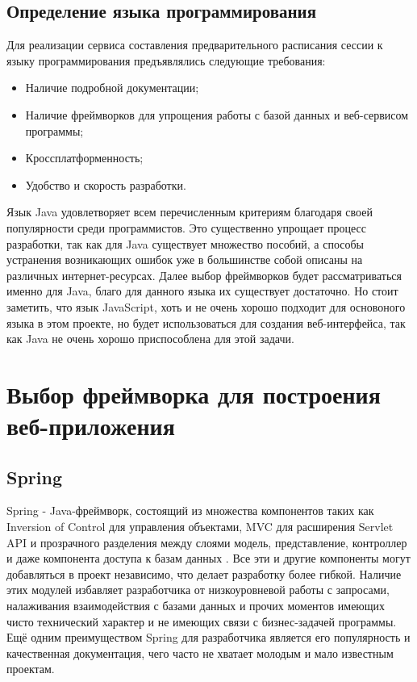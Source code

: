 \subsection{Определение языка программирования}
Для реализации сервиса составления предварительного расписания сессии к языку программирования предъявлялись следующие требования:
\begin{itemize}
\item Наличие подробной документации;
\item Наличие фреймворков для упрощения работы с базой данных и веб-сервисом программы;
\item Кроссплатформенность;
\item Удобство и скорость разработки.
\end{itemize}

Язык Java удовлетворяет всем перечисленным критериям благодаря своей популярности среди программистов. Это существенно упрощает процесс разработки, так как для Java существует множество пособий, а способы устранения возникающих ошибок уже в большинстве собой описаны на различных интернет-ресурсах. Далее выбор фреймворков будет рассматриваться именно для Java, благо для данного языка их существует достаточно. Но стоит заметить, что язык JavaScript, хоть и не очень хорошо подходит для основоного языка в этом проекте, но будет использоваться для создания веб-интерфейса, так как Java не очень хорошо приспособлена для этой задачи.

\section{Выбор фреймворка для построения веб-приложения} \label{ch3:sec2}
\subsection{Spring}
Spring - Java-фреймворк, состоящий из множества компонентов таких как Inversion of Control для управления объектами, MVC для расширения Servlet API и прозрачного разделения между слоями модель, представление, контроллер и даже компонента доступа к базам данных \cite{spring}. Все эти и другие компоненты могут добавляться в проект независимо, что делает разработку более гибкой. Наличие этих модулей избавляет разработчика от низкоуровневой работы с запросами, налаживания взаимодействия с базами данных и прочих моментов имеющих чисто технический характер и не имеющих связи с бизнес-задачей программы. Ещё одним преимуществом Spring  для разработчика является его популярность и качественная документация, чего часто не хватает молодым и мало известным проектам.

